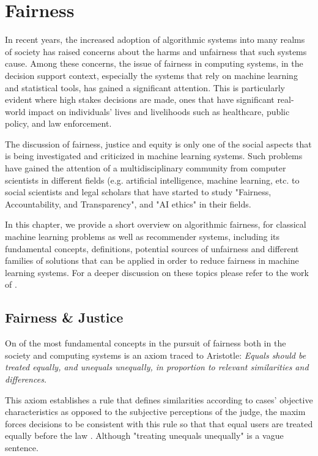 \chapter{Fairness}
\label{ch:fairness}

In recent years, the increased adoption of algorithmic systems into many realms of society has raised concerns about the harms and unfairness that such systems cause. Among these concerns, the issue of fairness in computing systems, in the decision support context, especially the systems that rely on machine learning and statistical tools, has gained a significant attention\cite{mitchell2021algorithmic}. This is particularly evident where high stakes decisions are made, ones that have significant real-world impact on individuals’ lives and livelihoods such as healthcare, public policy, and law enforcement.

The discussion of fairness, justice and equity is only one of the social aspects that is being investigated and criticized in machine learning systems. Such problems have gained the attention of a multidisciplinary community from computer scientists in different fields (e.g. artificial intelligence, machine learning, etc. to social scientists and legal scholars that have started to study "Fairness, Accountability, and Transparency", and "AI ethics" in their fields.

In this chapter, we provide a short overview on algorithmic fairness, for classical machine learning problems as well as recommender systems, including its fundamental concepts, definitions, potential sources of unfairness and different families of solutions that can be applied in order to reduce fairness in machine learning systems. For a deeper discussion on these topics please refer to the work of \cite{mitchell2021algorithmic,barocas2016big,barocas2018fairness}.

\section{Fairness \& Justice}
\label{sec:fair_&_justice}
    
    On of the most fundamental concepts in the pursuit of fairness both in the society and computing systems is an axiom traced to Aristotle: \textit{Equals should be treated equally, and unequals unequally, in proportion to relevant similarities and differences.}
    
    This axiom establishes a rule that defines similarities according to cases’ objective characteristics as opposed to the subjective perceptions of the judge, the maxim forces decisions to be consistent with this rule so that that equal users are treated equally before the law \cite{Gosepath2011equality}. Although "treating unequals unequally" is a vague sentence. 
    
